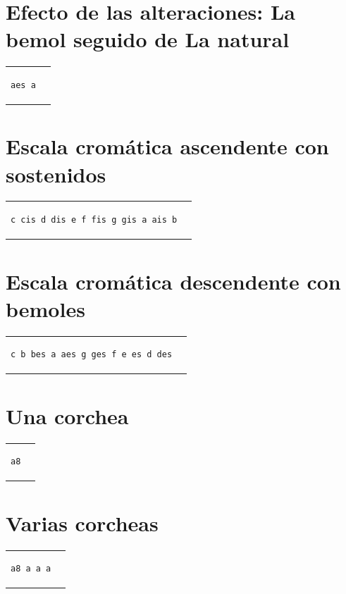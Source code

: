 \documentclass[a4paper,10pt,oneside,headinclude,titlepage]{article} %
\begin{document}
\section*{Efecto de las alteraciones: La bemol seguido de La natural}
\begin{tabular}{m{2cm}m{2cm}}
\begin{verbatim}
aes a
\end{verbatim}
&
\begin[fragment,relative=2,notime]{lilypond}
aes a
\end{lilypond}
\end{tabular}

\section*{Escala cromática ascendente con sostenidos}
\begin{tabular}{m{6cm}m{2cm}}
\begin{verbatim}
c cis d dis e f fis g gis a ais b
\end{verbatim}
&
\begin[fragment,relative=1,notime]{lilypond}
c cis d dis e f fis g gis a ais b
\end{lilypond}
\end{tabular}

\section*{Escala cromática descendente con bemoles}
\begin{tabular}{m{6cm}m{2cm}}
\begin{verbatim}
c b bes a aes g ges f e es d des
\end{verbatim}
&
\begin[fragment,relative=2,notime]{lilypond}
c b bes a aes g ges f e es d des
\end{lilypond}
\end{tabular}

\section*{Una corchea}
\begin{tabular}{m{2cm}m{2cm}}
\begin{verbatim}
a8
\end{verbatim}
&
\begin[fragment,relative=2,notime]{lilypond}
a8
\end{lilypond}
\end{tabular}

\section*{Varias corcheas}
\begin{tabular}{m{2cm}m{2cm}}
\begin{verbatim}
a8 a a a
\end{verbatim}
&
\begin[fragment,relative=2,notime]{lilypond}
a8 a a a
\end{lilypond}
\end{tabular}
\end{document}
